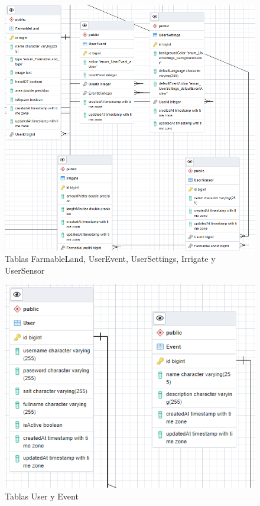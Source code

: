 \begin{figure}[H]
    \centering
    \includegraphics[width=1\linewidth]{images/design/erd3.png}
    \caption{Tablas FarmableLand, UserEvent, UserSettings, Irrigate y UserSensor}
\end{figure}

\begin{figure}[H]
    \centering
    \includegraphics[width=1\linewidth]{images/design/erd4.png}
    \caption{Tablas User y Event}
\end{figure}

